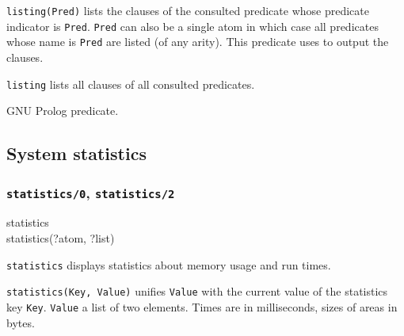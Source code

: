 \texttt{listing(Pred)} lists the clauses of the consulted predicate whose
predicate indicator is \texttt{Pred}. \texttt{Pred} can also be a single
atom in which case all predicates whose name is \texttt{Pred} are listed (of
any arity). This predicate uses 
 to output the clauses. 

\texttt{listing} lists all clauses of all consulted predicates.

\begin{PlErrors}



\end{PlErrors}

\Portability

GNU Prolog predicate.

\subsection{System statistics}

\subsubsection{\texttt{statistics/0},
               \texttt{statistics/2}}

\begin{TemplatesOneCol}
statistics\\
statistics(?atom, ?list)

\end{TemplatesOneCol}

\Description

\texttt{statistics} displays statistics about memory usage and run times.

\texttt{statistics(Key, Value)} unifies \texttt{Value} with the current
value of the statistics key \texttt{Key}. \texttt{Value} a list of two
elements. Times are in milliseconds, sizes of areas in bytes.

